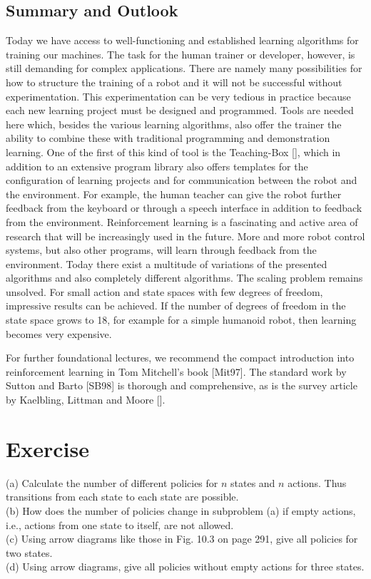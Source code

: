 \documentclass[10pt]{book}
\begin{document}
\subsection{Summary and Outlook}
Today we have access to well-functioning and established learning algorithms for training our machines. The task for the human trainer or developer, however, is still demanding for complex applications. There are namely many possibilities for how to structure the training of a robot and it will not be successful without experimentation. This experimentation can be very tedious in practice because each new learning project must be designed and programmed. Tools are needed here which, besides the various learning algorithms, also offer the trainer the ability to combine these with traditional programming and demonstration learning. One of the first of this kind of tool is the Teaching-Box [\cite{ertel2009teachingbox}], which in addition to an extensive program library also offers templates for the configuration of learning projects and for communication between the robot and the environment. For example, the human teacher can give the robot further feedback from the keyboard or through a speech interface in addition to feedback from the environment.
Reinforcement learning is a fascinating and active area of research that will be increasingly used in the future. More and more robot control systems, but also other programs, will learn through feedback from the environment. Today there exist a multitude of variations of the presented algorithms and also completely different algorithms. The scaling problem remains unsolved. For small action and state spaces with few degrees of freedom, impressive results can be achieved. If the number of degrees of freedom in the state space grows to 18, for example for a simple humanoid robot, then learning becomes very expensive.

For further foundational lectures, we recommend the compact introduction into reinforcement learning in Tom Mitchell's book [Mit97]. The standard work by Sutton and Barto [SB98] is thorough and comprehensive, as is the survey article by Kaelbling, Littman and Moore [\cite{kaelbling1996survey}].

\section{Exercise}
(a) Calculate the number of different policies for $n$ states and $n$ actions. Thus transitions from each state to each state are possible.\\
(b) How does the number of policies change in subproblem (a) if empty actions, i.e., actions from one state to itself, are not allowed.\\
(c) Using arrow diagrams like those in Fig. 10.3 on page 291, give all policies for two states.\\
(d) Using arrow diagrams, give all policies without empty actions for three states.
\end{document}
